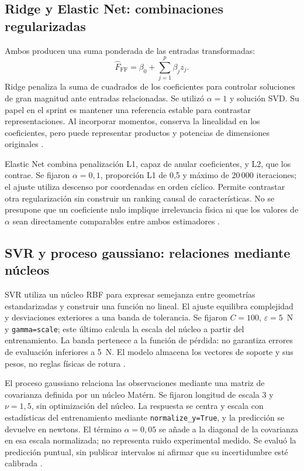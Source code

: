 \subsection{Ridge y Elastic Net: combinaciones regularizadas}
Ambos producen una suma ponderada de las entradas transformadas:
\begin{equation}
\widehat F_{\mathrm{FF}}=\beta_0+\sum_{j=1}^{p}\beta_j z_j.
\end{equation}
Ridge penaliza la suma de cuadrados de los coeficientes para controlar soluciones de gran magnitud ante entradas relacionadas. Se utilizó $\alpha=1$ y solución SVD. Su papel en el sprint es mantener una referencia estable para contrastar representaciones. Al incorporar momentos, conserva la linealidad en los coeficientes, pero puede representar productos y potencias de dimensiones originales \cite{sklearnridge}.

Elastic Net combina penalización L1, capaz de anular coeficientes, y L2, que los contrae. Se fijaron $\alpha=0{,}1$, proporción L1 de 0,5 y máximo de 20\,000 iteraciones; el ajuste utiliza descenso por coordenadas en orden cíclico. Permite contrastar otra regularización sin construir un ranking causal de características. No se presupone que un coeficiente nulo implique irrelevancia física ni que los valores de $\alpha$ sean directamente comparables entre ambos estimadores \cite{sklearnelasticnet}.

\subsection{SVR y proceso gaussiano: relaciones mediante núcleos}
SVR utiliza un núcleo RBF para expresar semejanza entre geometrías estandarizadas y construir una función no lineal. El ajuste equilibra complejidad y desviaciones exteriores a una banda de tolerancia. Se fijaron $C=100$, $\varepsilon=5$~N y \texttt{gamma=scale}; este último calcula la escala del núcleo a partir del entrenamiento. La banda pertenece a la función de pérdida: no garantiza errores de evaluación inferiores a 5~N. El modelo almacena los vectores de soporte y sus pesos, no reglas físicas de rotura \cite{sklearnsvr}.

El proceso gaussiano relaciona las observaciones mediante una matriz de covarianza definida por un núcleo Matérn. Se fijaron longitud de escala 3 y $\nu=1{,}5$, sin optimización del núcleo. La respuesta se centra y escala con estadísticas del entrenamiento mediante \texttt{normalize\_y=True}, y la predicción se devuelve en newtons. El término $\alpha=0{,}05$ se añade a la diagonal de la covarianza en esa escala normalizada; no representa ruido experimental medido. Se evaluó la predicción puntual, sin publicar intervalos ni afirmar que su incertidumbre esté calibrada \cite{sklearngpr}.

